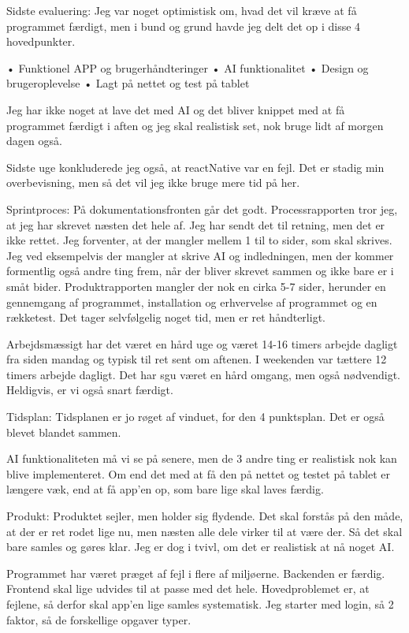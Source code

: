 \documentclass{report}
\begin{document}
Sidste evaluering:
Jeg var noget optimistisk om, hvad det vil kræve at få programmet færdigt, men i bund og grund havde jeg delt det op i disse 4 hovedpunkter.

	• Funktionel APP og brugerhåndteringer
	• AI funktionalitet
	• Design og brugeroplevelse
	• Lagt på nettet og test på tablet

Jeg har ikke noget at lave det med AI og det bliver knippet med at få programmet færdigt i aften og jeg skal realistisk set, nok bruge lidt af morgen dagen også.

Sidste uge konkluderede jeg også, at reactNative var en fejl. Det er stadig min overbevisning, men så det vil jeg ikke bruge mere tid på her.

Sprintproces:
På dokumentationsfronten går det godt.
Processrapporten tror jeg, at jeg har skrevet næsten det hele af. Jeg har sendt det til retning, men det er ikke rettet. Jeg forventer, at der mangler mellem 1 til to sider, som skal skrives. Jeg ved eksempelvis der mangler at skrive AI og indledningen, men der kommer formentlig også andre ting frem, når der bliver skrevet sammen og ikke bare er i småt bider.
Produktrapporten mangler der nok en cirka 5-7 sider, herunder en gennemgang af programmet, installation og erhvervelse af programmet og en rækketest. Det tager selvfølgelig noget tid, men er ret håndterligt.

Arbejdsmæssigt har det været en hård uge og været 14-16 timers arbejde dagligt fra siden mandag og typisk til ret sent om aftenen. I weekenden var tættere 12 timers arbejde dagligt. Det har sgu været en hård omgang, men også nødvendigt. Heldigvis, er vi også snart færdigt.

Tidsplan:
Tidsplanen er jo røget af vinduet, for den 4 punktsplan.
Det er også blevet blandet sammen.

AI funktionaliteten må vi se på senere, men de 3 andre ting er realistisk nok kan blive implementeret.
Om end det med at få den på nettet og testet på tablet er længere væk, end at få app'en op, som bare lige skal laves færdig.


Produkt:
Produktet sejler, men holder sig flydende.
Det skal forstås på den måde, at der er ret rodet lige nu, men næsten alle dele virker til at være der. Så det skal bare samles og gøres klar.
Jeg er dog i tvivl, om det er realistisk at nå noget AI.

Programmet har været præget af fejl i flere af miljøerne.
Backenden er færdig. Frontend skal lige udvides til at passe med det hele.
Hovedproblemet er, at fejlene, så derfor skal app'en lige samles systematisk.
Jeg starter med login, så 2 faktor, så de forskellige opgaver typer.
\end{document}
